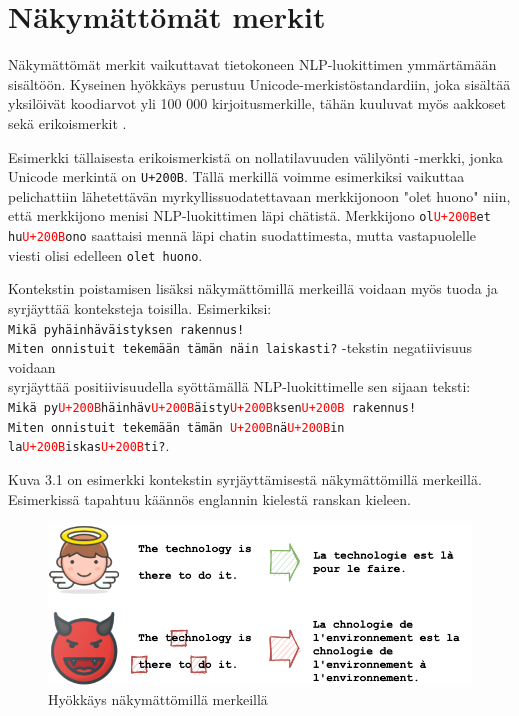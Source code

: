 \section{Näkymättömät merkit}
Näkymättömät merkit vaikuttavat tietokoneen NLP-luokittimen ymmärtämään sisältöön. Kyseinen hyökkäys perustuu Unicode-merkistöstandardiin, joka sisältää yksilöivät koodiarvot yli 100 000 kirjoitusmerkille, tähän kuuluvat myös aakkoset sekä erikoismerkit \citep{boucher2021bad}.

Esimerkki tällaisesta erikoismerkistä on nollatilavuuden välilyönti -merkki, jonka Unicode merkintä on \texttt{U+200B}. Tällä merkillä voimme esimerkiksi vaikuttaa pelichattiin lähetettävän myrkyllissuodatettavaan merkkijonoon "olet huono" niin, että merkkijono menisi NLP-luokittimen läpi chätistä. Merkkijono \texttt{ol\textcolor{red}{U+200B}et hu\textcolor{red}{U+200B}ono} saattaisi mennä läpi chatin suodattimesta, mutta vastapuolelle viesti olisi edelleen \texttt{olet huono}.

Kontekstin poistamisen lisäksi näkymättömillä merkeillä voidaan myös tuoda ja syrjäyttää konteksteja toisilla. Esimerkiksi:\\
\texttt{Mikä pyhäinhäväistyksen rakennus!\\
  Miten onnistuit tekemään tämän näin laiskasti?} -tekstin negatiivisuus voidaan\\
syrjäyttää positiivisuudella syöttämällä NLP-luokittimelle sen sijaan teksti:\\
\texttt{Mikä py\textcolor{red}{U+200B}häinhäv\textcolor{red}{U+200B}äisty\textcolor{red}{U+200B}ksen\textcolor{red}{U+200B} rakennus!\\
  Miten onnistuit tekemään tämän \textcolor{red}{U+200B}nä\textcolor{red}{U+200B}in la\textcolor{red}{U+200B}iskas\textcolor{red}{U+200B}ti?}.

Kuva 3.1 on esimerkki kontekstin syrjäyttämisestä näkymättömillä merkeillä. Esimerkissä tapahtuu käännös englannin kielestä ranskan kieleen.
\begin{figure}[hbt]
  \includegraphics[scale=0.599]{figures/invisible.png}
  \caption{Hyökkäys näkymättömillä merkeillä \citep{boucher2021bad}}
\end{figure}

